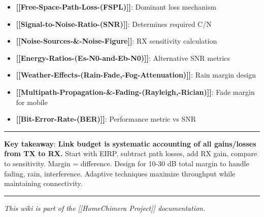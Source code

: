 \begin{itemize}
\tightlist
\item
  \textbf{{[}{[}Free-Space-Path-Loss-(FSPL){]}{]}}: Dominant loss
  mechanism
\item
  \textbf{{[}{[}Signal-to-Noise-Ratio-(SNR){]}{]}}: Determines required
  C/N
\item
  \textbf{{[}{[}Noise-Sources-\&-Noise-Figure{]}{]}}: RX sensitivity
  calculation
\item
  \textbf{{[}{[}Energy-Ratios-(Es-N0-and-Eb-N0){]}{]}}: Alternative SNR
  metrics
\item
  \textbf{{[}{[}Weather-Effects-(Rain-Fade,-Fog-Attenuation){]}{]}}:
  Rain margin design
\item
  \textbf{{[}{[}Multipath-Propagation-\&-Fading-(Rayleigh,-Rician){]}{]}}:
  Fade margin for mobile
\item
  \textbf{{[}{[}Bit-Error-Rate-(BER){]}{]}}: Performance metric vs SNR
\end{itemize}

\begin{center}\rule{0.5\linewidth}{0.5pt}\end{center}

\textbf{Key takeaway}: \textbf{Link budget is systematic accounting of
all gains/losses from TX to RX.} Start with EIRP, subtract path losses,
add RX gain, compare to sensitivity. Margin = difference. Design for
10-30 dB total margin to handle fading, rain, interference. Adaptive
techniques maximize throughput while maintaining connectivity.

\begin{center}\rule{0.5\linewidth}{0.5pt}\end{center}

\emph{This wiki is part of the {[}{[}Home\textbar Chimera Project{]}{]}
documentation.}
